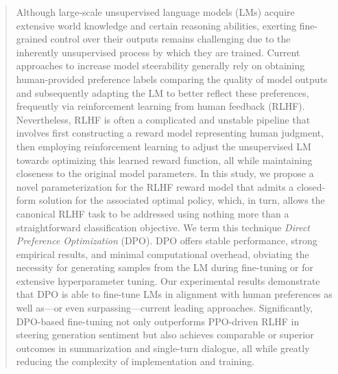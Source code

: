 \begin{abstract}
Although large-scale unsupervised language models (LMs) acquire extensive world knowledge and certain reasoning abilities, exerting fine-grained control over their outputs remains challenging due to the inherently unsupervised process by which they are trained. Current approaches to increase model steerability generally rely on obtaining human-provided preference labels comparing the quality of model outputs and subsequently adapting the LM to better reflect these preferences, frequently via reinforcement learning from human feedback (RLHF). Nevertheless, RLHF is often a complicated and unstable pipeline that involves first constructing a reward model representing human judgment, then employing reinforcement learning to adjust the unsupervised LM towards optimizing this learned reward function, all while maintaining closeness to the original model parameters. In this study, we propose a novel parameterization for the RLHF reward model that admits a closed-form solution for the associated optimal policy, which, in turn, allows the canonical RLHF task to be addressed using nothing more than a straightforward classification objective. We term this technique \textit{Direct Preference Optimization} (DPO). DPO offers stable performance, strong empirical results, and minimal computational overhead, obviating the necessity for generating samples from the LM during fine-tuning or for extensive hyperparameter tuning. Our experimental results demonstrate that DPO is able to fine-tune LMs in alignment with human preferences as well as—or even surpassing—current leading approaches. Significantly, DPO-based fine-tuning not only outperforms PPO-driven RLHF in steering generation sentiment but also achieves comparable or superior outcomes in summarization and single-turn dialogue, all while greatly reducing the complexity of implementation and training. 
\end{abstract}

